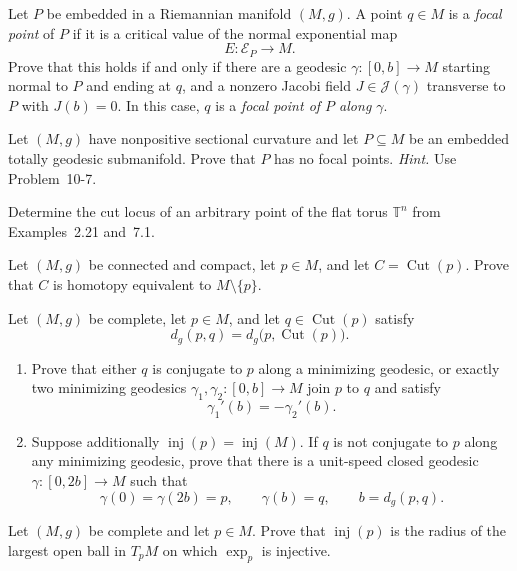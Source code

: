 \begin{exercise}
\label{prob:focal-point-characterization}

Let $P$ be embedded in a Riemannian manifold $(M,g)$. A point $q\in M$ is a
\emph{focal point} of $P$ if it is a critical value of the normal exponential
map
\[
E:\mathcal E_P\to M.
\]
Prove that this holds if and only if there are a geodesic
$\gamma:[0,b]\to M$ starting normal to $P$ and ending at $q$, and a nonzero
Jacobi field $J\in\mathcal J(\gamma)$ transverse to $P$ with $J(b)=0$. In
this case, $q$ is a \emph{focal point of $P$ along $\gamma$}.
\end{exercise}

\begin{exercise}
\label{prob:nonpositive-curvature-focal-points}

Let $(M,g)$ have nonpositive sectional curvature and let
$P\subseteq M$ be an embedded totally geodesic submanifold. Prove that $P$
has no focal points. \emph{Hint.} Use Problem~10-7.
\end{exercise}

\begin{exercise}
\label{prob:cut-locus-flat-torus}

Determine the cut locus of an arbitrary point of the flat torus
$\mathbb T^n$ from Examples~2.21 and~7.1.
\end{exercise}

\begin{exercise}
\label{prob:cut-locus-homotopy-equivalence}

Let $(M,g)$ be connected and compact, let $p\in M$, and let
$C=\operatorname{Cut}(p)$. Prove that
$C$ is homotopy equivalent to $M\setminus\{p\}$.
\end{exercise}

\begin{exercise}
\label{prob:distance-cut-locus}

Let $(M,g)$ be complete, let $p\in M$, and let
$q\in\operatorname{Cut}(p)$ satisfy
\[
d_g(p,q)=d_g\bigl(p,\operatorname{Cut}(p)\bigr).
\]
\begin{enumerate}
\item[(a)] Prove that either $q$ is conjugate to $p$ along a minimizing
geodesic, or exactly two minimizing geodesics
$\gamma_1,\gamma_2:[0,b]\to M$ join $p$ to $q$ and satisfy
\[
\gamma_1'(b)=-\gamma_2'(b).
\]
\item[(b)] Suppose additionally
$\operatorname{inj}(p)=\operatorname{inj}(M)$. If $q$ is not conjugate to
$p$ along any minimizing geodesic, prove that there is a unit-speed closed
geodesic $\gamma:[0,2b]\to M$ such that
\[
\gamma(0)=\gamma(2b)=p,\qquad
\gamma(b)=q,\qquad
b=d_g(p,q).
\]
\end{enumerate}
\end{exercise}

\begin{exercise}
\label{prob:injectivity-radius-exponential}

Let $(M,g)$ be complete and let $p\in M$. Prove that
$\operatorname{inj}(p)$ is the radius of the largest open ball in $T_pM$ on
which $\exp_p$ is injective.
\end{exercise}
